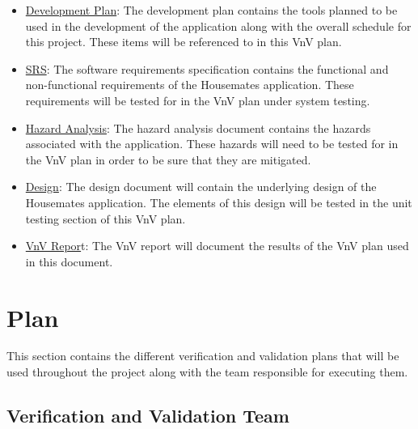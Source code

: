 \documentclass[12pt, titlepage]{article}
\begin{document}
\begin{itemize}
    \item \href{https://github.com/DangJustin/CapstoneProject/blob/main/docs/DevelopmentPlan/DevelopmentPlan.pdf}{Development Plan}: The development plan contains the tools planned to be used in the development of the application along with the overall schedule for this project. These items will be referenced to in this VnV plan.  
    \item \href{https://github.com/DangJustin/CapstoneProject/blob/main/docs/SRS-Volere/SRS.pdf}{SRS}: The software requirements specification contains the functional and non-functional requirements of the Housemates application. These requirements will be tested for in the VnV plan under system testing. 
    \item \href{https://github.com/DangJustin/CapstoneProject/blob/main/docs/HazardAnalysis/HazardAnalysis.pdf}{Hazard Analysis}: The hazard analysis document contains the hazards associated with the application. These hazards will need to be tested for in the VnV plan in order to be sure that they are mitigated.
    \item \href{https://github.com/DangJustin/CapstoneProject/tree/main/docs/Design}{Design}: The design document will contain the underlying design of the Housemates application. The elements of this design will be tested in the unit testing section of this VnV plan.
    \item \href{https://github.com/DangJustin/CapstoneProject/blob/main/docs/VnVReport/VnVReport.pdf}{VnV Repor}t: The VnV report will document the results of the VnV plan used in this document.
\end{itemize}




\section{Plan}

This section contains the different verification and validation plans that will be used throughout the project along with the team responsible for executing them.  


\subsection{Verification and Validation Team}
\end{document}
